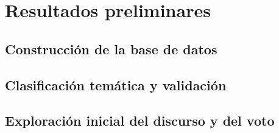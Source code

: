 \chapter{Resultados preliminares}
\label{cap:resultados-preliminares}

\section{Construcción de la base de datos}
\label{sec:res-base}

\section{Clasificación temática y validación}
\label{sec:res-tematica}

\section{Exploración inicial del discurso y del voto}
\label{sec:res-exploracion}
